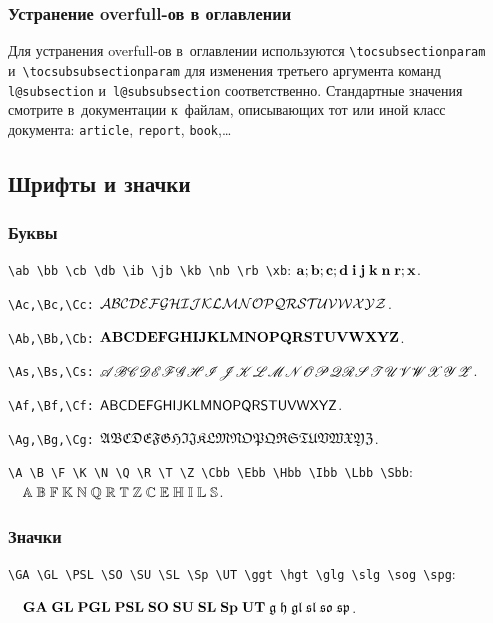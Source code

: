\documentclass[a4paper]{article}
\begin{document}
\subsubsection{Устранение overfull-ов в оглавлении}
Для устранения overfull-ов в~оглавлении используются
\verb'\tocsubsectionparam' и~\verb'\tocsubsubsectionparam' для изменения третьего аргумента
команд \verb'l@subsection' и~\verb'l@subsubsection' соответственно. Стандартные значения смотрите
в~документации к~файлам, описывающих тот или иной класс документа: \texttt{article},
\texttt{report}, \texttt{book},\dots

\subsection{Шрифты и значки}

\subsubsection{Буквы}

\verb'\ab \bb \cb \db \ib \jb \kb \nb \rb \xb':
$\ab; \bb; \cb; \db\; \ib\; \jb\; \kb\; \nb\; \rb; \xb$.

\verb$\Ac,\Bc,\Cc:$ $\Ac\Bc\Cc\Dc\Ec\Fc\Gc\Hc\Ic\Jc\Kc\Lc\Mc\Nc\Oc\Pc\Qc\Rc\Sc\Tc\Uc\Vc\Wc\Xc\Yc\Zc$.

\verb$\Ab,\Bb,\Cb:$ $\Ab\Bb\Cb\Db\Eb\Fb\Gb\Hb\Ib\Jb\Kb\Lb\Mb\Nb\Ob\Pb\Qb\Rb\Sb\Tb\Ub\Vb\Wb\Xb\Yb\Zb$.

\verb$\As,\Bs,\Cs:$ $\As\Bs\Cs\Ds\Es\Fs\Gs\Hs\Is\Js\Ks\Ls\Ms\Ns\Os\Ps\Qs\Rs\Ss\Ts\Us\Vs\Ws\Xs\Ys\Zs$.

\verb$\Af,\Bf,\Cf:$ $\Af\Bf\Cf\Df\Ef\Ff\Gf\Hf\If\Jf\Kf\Lf\Mf\Nf\Of\Pf\Qf\Rf\Sf\Tf\Uf\Vf\Wf\Xf\Yf\Zf$.

\verb$\Ag,\Bg,\Cg:$ $\Ag\Bg\Cg\Dg\Eg\Fg\Gg\Hg\Ig\Jg\Kg\Lg\Mg\Ng\Og\Pg\Qg\Rg\Sg\Tg\Ug\Vg\Wg\Xg\Yg\Zg$.

\verb$\A \B \F \K \N \Q \R \T \Z \Cbb \Ebb \Hbb \Ibb \Lbb \Sbb$:
$\quad\A\;\B\;\F\;\K\;\N\;\Q\;\R\;\T\;\Z\;\Cbb\;\Ebb\;\Hbb\;\Ibb\;\Lbb\;\Sbb$.

\subsubsection{Значки}

\verb$\GA \GL \PSL \SO \SU \SL \Sp \UT \ggt \hgt \glg \slg \sog \spg$:

$\quad\GA\;\GL\;\PGL\;\PSL\;\SO\;\SU\;\SL\;\Sp\;\UT\;\ggt\;\hgt\;\glg\;\slg\;\sog\;\spg$.

\medskip
\end{document}
